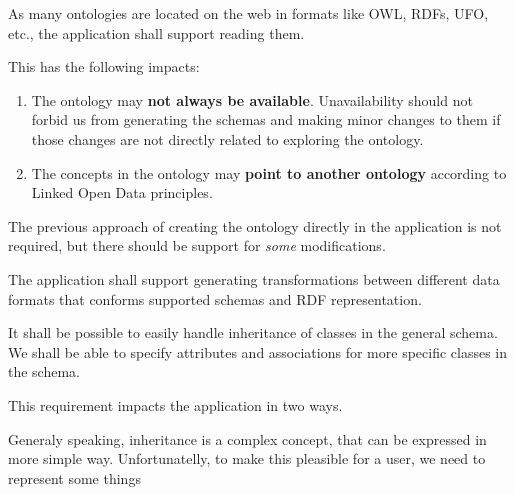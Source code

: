 

\begin{requirement}
    \label{requirement:ontologies-on-the-web}
    As many ontologies are located on the web in formats like OWL, RDFs, UFO, etc., the application shall support reading them.
\end{requirement}

This has the following impacts:
\begin{enumerate}
    \item The ontology may \textbf{not always be available}. Unavailability should not forbid us from generating the schemas and making minor changes to them if those changes are not directly related to exploring the ontology.
    \item The concepts in the ontology may \textbf{point to another ontology} according to Linked Open Data principles.
\end{enumerate}

\begin{requirement}
    \label{requirement:pim-editing}
    The previous approach of creating the ontology directly in the application is not required, but there should be support for \textit{some} modifications.
\end{requirement}

\begin{requirement}
    The application shall support generating transformations between different data formats that conforms supported schemas and RDF representation.
\end{requirement}




\begin{requirement}
    It shall be possible to easily handle inheritance of classes in the general schema. We shall be able to specify attributes and associations for more specific classes in the schema.
\end{requirement}

This requirement impacts the application in two ways.

Generaly speaking, inheritance is a complex concept, that can be expressed in more simple way. Unfortunatelly, to make this pleasible for a user, we need to represent some things %

